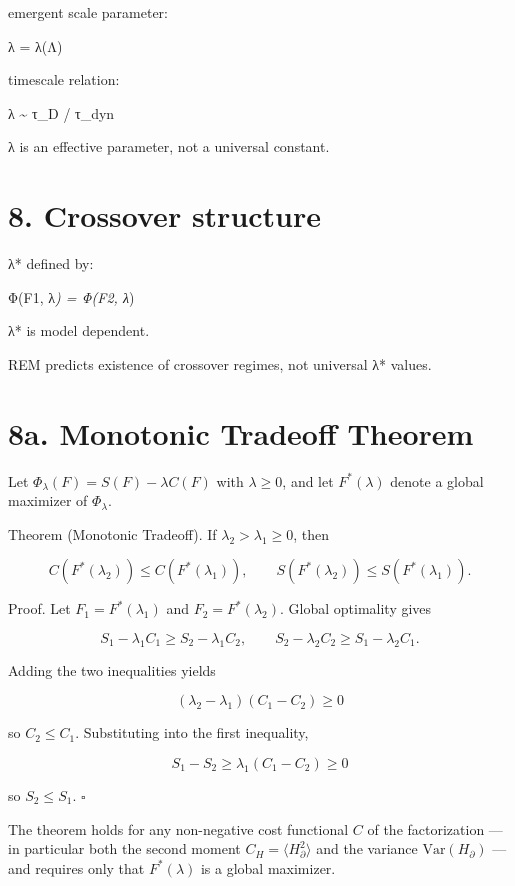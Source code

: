 \documentclass[
]{article}
\begin{document}
emergent scale parameter:

λ = λ(Λ)

timescale relation:

λ \textasciitilde{} τ\_D / τ\_dyn

λ is an effective parameter, not a universal constant.

\section{8. Crossover structure}\label{crossover-structure}

λ* defined by:

Φ(F1, λ\emph{) = Φ(F2, λ})

λ* is model dependent.

REM predicts existence of crossover regimes, not universal λ* values.

\section{8a. Monotonic Tradeoff Theorem}\label{monotonic-tradeoff-theorem}

Let $\Phi_\lambda(F) = S(F) - \lambda C(F)$ with $\lambda \geq 0$, and let
$F^*(\lambda)$ denote a global maximizer of $\Phi_\lambda$.

Theorem (Monotonic Tradeoff). If $\lambda_2 > \lambda_1 \geq 0$, then

\[
C(F^*(\lambda_2)) \leq C(F^*(\lambda_1)), \qquad
S(F^*(\lambda_2)) \leq S(F^*(\lambda_1)).
\]

Proof. Let $F_1 = F^*(\lambda_1)$ and $F_2 = F^*(\lambda_2)$. Global
optimality gives

\[
S_1 - \lambda_1 C_1 \geq S_2 - \lambda_1 C_2, \qquad
S_2 - \lambda_2 C_2 \geq S_1 - \lambda_2 C_1.
\]

Adding the two inequalities yields

\[
(\lambda_2 - \lambda_1)(C_1 - C_2) \geq 0
\]

so $C_2 \leq C_1$. Substituting into the first inequality,

\[
S_1 - S_2 \geq \lambda_1(C_1 - C_2) \geq 0
\]

so $S_2 \leq S_1$. $\square$

The theorem holds for any non-negative cost functional $C$ of the
factorization --- in particular both the second moment
$C_H = \langle H_{\partial}^2\rangle$ and the variance
$\mathrm{Var}(H_{\partial})$ --- and requires only that $F^*(\lambda)$
is a global maximizer.
\end{document}
